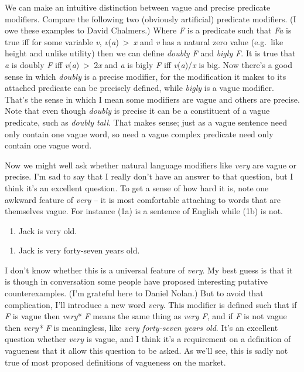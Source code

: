 \documentclass[
  11pt,
  letterpaper,
  DIV=11,
  numbers=noendperiod,
  twoside]{scrartcl}
\providecommand{\tightlist}{%
  \setlength{\itemsep}{0pt}\setlength{\parskip}{0pt}}
\begin{document}
We can make an intuitive distinction between vague and precise predicate
modifiers. Compare the following two (obviously artificial) predicate
modifiers. (I owe these examples to David Chalmers.) Where \emph{F} is a
predicate such that \emph{Fa} is true iff for some variable \emph{v},
\emph{v}(\emph{a})~\textgreater~\emph{x} and \emph{v} has a natural zero
value (e.g.~like height and unlike utility) then we can define
\emph{doubly F} and \emph{bigly F}. It is true that \emph{a} is doubly
\emph{F} iff \emph{v}(\emph{a})~\textgreater~2\emph{x} and \emph{a} is
bigly \emph{F} iff \emph{v}(\emph{a})/\emph{x} is big. Now there's a
good sense in which \emph{doubly} is a precise modifier, for the
modification it makes to its attached predicate can be precisely
defined, while \emph{bigly} is a vague modifier. That's the sense in
which I mean some modifiers are vague and others are precise. Note that
even though \emph{doubly} is precise it can be a constituent of a vague
predicate, such as \emph{doubly tall}. That makes sense; just as a vague
sentence need only contain one vague word, so need a vague complex
predicate need only contain one vague word.

Now we might well ask whether natural language modifiers like
\emph{very} are vague or precise. I'm sad to say that I really don't
have an answer to that question, but I think it's an excellent question.
To get a sense of how hard it is, note one awkward feature of
\emph{very} -- it is most comfortable attaching to words that are
themselves vague. For instance (1a) is a sentence of English while (1b)
is not.

\begin{description}
\tightlist
\item[(1)]
\hfill
\begin{enumerate}
\def\labelenumi{(\alph{enumi})}
\tightlist
\item
  Jack is very old.
\end{enumerate}

\begin{enumerate}
\def\labelenumi{(\alph{enumi})}
\setcounter{enumi}{1}
\tightlist
\item
  Jack is very forty-seven years old.
\end{enumerate}
\end{description}

I don't know whether this is a universal feature of \emph{very}. My best
guess is that it is though in conversation some people have proposed
interesting putative counterexamples. (I'm grateful here to Daniel
Nolan.) But to avoid that complication, I'll introduce a new word
\emph{very}. This modifier is defined such that if \emph{F} is vague
then \emph{very}* \emph{F} means the same thing as \emph{very F}, and if
\emph{F} is not vague then \emph{very* F} is meaningless, like
\emph{very forty-seven years old}. It's an excellent question whether
\emph{very} is vague, and I think it's a requirement on a definition of
vagueness that it allow this question to be asked. As we'll see, this is
sadly not true of most proposed definitions of vagueness on the market.
\end{document}
